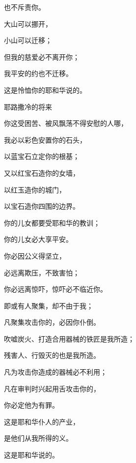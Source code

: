 {\par }{\Q 也不斥责你。
\par }{\Q {}大山可以挪开，
\par }{\Q 小山可以迁移；
\par }{\Q 但我的慈爱必不离开你；
\par }{\Q 我平安的约也不迁移。
\par }{\Q 这是怜恤你的耶和华说的。
\par }{\SH 耶路撒冷的将来
\par }{\Q {}你这受困苦、被风飘荡不得安慰的人哪，
\par }{\Q 我必以彩色安置你的石头，
\par }{\Q 以蓝宝石立定你的根基；
\par }{\Q {}又以红宝石造你的女墙，
\par }{\Q 以红玉造你的城门，
\par }{\Q 以宝石造你四围的边界。
\par }{\Q {}你的儿女都要受耶和华的教训；
\par }{\Q 你的儿女必大享平安。
\par }{\Q {}你必因公义得坚立，
\par }{\Q 必远离欺压，不致害怕；
\par }{\Q 你必远离惊吓，惊吓必不临近你。
\par }{\Q {}即或有人聚集，却不由于我；
\par }{\Q 凡聚集攻击你的，必因你仆倒。
\par }{\Q {}吹嘘炭火、打造合用器械的铁匠是我所造；
\par }{\Q 残害人、行毁灭的也是我所造。
\par }{\Q {}凡为攻击你造成的器械必不利用；
\par }{\Q 凡在审判时兴起用舌攻击你的，
\par }{\Q 你必定他为有罪。
\par }{\Q 这是耶和华仆人的产业，
\par }{\Q 是他们从我所得的义。
\par }{\Q 这是耶和华说的。

}
